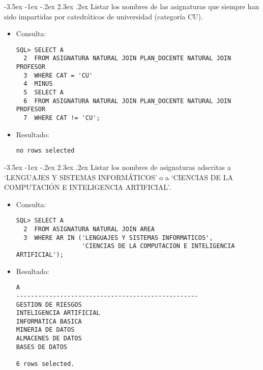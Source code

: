 \documentclass[11pt]{report}
\makeatletter
\renewcommand\chapter{\@startsection{chapter}{0}{\z@}%
    {-3.5ex \@plus -1ex \@minus -.2ex}%
    {2.3ex \@plus.2ex}%
    {\normalfont\Large\bfseries}}
\makeatother
\begin{document}
\chapter{Listar los nombres de las asignaturas que siempre han sido impartidas por catedráticos de universidad (categoría CU).}
\begin{itemize}
  \item Consulta:
  \begin{verbatim}
SQL> SELECT A
  2  FROM ASIGNATURA NATURAL JOIN PLAN_DOCENTE NATURAL JOIN PROFESOR
  3  WHERE CAT = 'CU'
  4  MINUS
  5  SELECT A
  6  FROM ASIGNATURA NATURAL JOIN PLAN_DOCENTE NATURAL JOIN PROFESOR
  7  WHERE CAT != 'CU';
  \end{verbatim}
  \item{Resultado:}
  \begin{verbatim}
no rows selected
  \end{verbatim}
\end{itemize}

\chapter{Listar los nombres de asignaturas adscritas a ‘LENGUAJES Y SISTEMAS INFORMÁTICOS’ o a ‘CIENCIAS DE LA COMPUTACIÓN E INTELIGENCIA ARTIFICIAL’.}
\begin{itemize}
  \item Consulta:
  \begin{verbatim}
SQL> SELECT A
  2  FROM ASIGNATURA NATURAL JOIN AREA
  3  WHERE AR IN ('LENGUAJES Y SISTEMAS INFORMATICOS', 
                  'CIENCIAS DE LA COMPUTACION E INTELIGENCIA ARTIFICIAL');
  \end{verbatim}
  \item{Resultado:}
  \begin{verbatim}
A                                                                               
--------------------------------------------------                              
GESTION DE RIESGOS                                                              
INTELIGENCIA ARTIFICIAL                                                         
INFORMATICA BASICA                                                              
MINERIA DE DATOS                                                                
ALMACENES DE DATOS                                                              
BASES DE DATOS                                                                  

6 rows selected.
  \end{verbatim}
\end{itemize}
\end{document}
